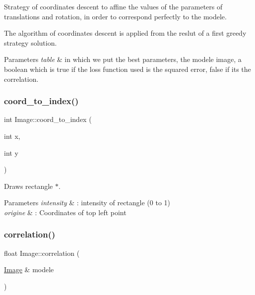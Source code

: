 Strategy of coordinates descent to affine the values of the parameters of translations and rotation, in order to correspond perfectly to the modele. 

The algorithm of coordinates descent is applied from the reslut of a first greedy strategy solution.


\begin{DoxyParams}{Parameters}
{\em table} & in which we put the best parameters, the modele image, a boolean which is true if the loss function used is the squared error, false if it\textquotesingle{}s the correlation. \\
\hline
\end{DoxyParams}
\mbox{\label{class_image_ad74c9687964b22f9fe9d01a75218802c}} 
\subsubsection{\texorpdfstring{coord\+\_\+to\+\_\+index()}{coord\_to\_index()}}
{\footnotesize\ttfamily int Image\+::coord\+\_\+to\+\_\+index (\begin{DoxyParamCaption}\item[{int}]{x,  }\item[{int}]{y }\end{DoxyParamCaption})}



Draws rectangle $\ast$. 


\begin{DoxyParams}{Parameters}
{\em intensity} & \+: intensity of rectangle (0 to 1) \\
\hline
{\em origine} & \+: Coordinates of top left point \\
\hline
\end{DoxyParams}
\mbox{\label{class_image_a398c9613ec6733d880c41f038a32baf5}} 
\subsubsection{\texorpdfstring{correlation()}{correlation()}}
{\footnotesize\ttfamily float Image\+::correlation (\begin{DoxyParamCaption}\item[{\hyperlink{class_image}{Image} \&}]{modele }\end{DoxyParamCaption})}



